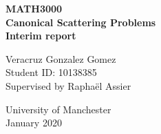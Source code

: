 \begin{titlepage}
   \begin{center}
       \vspace*{1cm}

       \textbf{MATH3000} \\
       \textbf{Canonical Scattering Problems}\\
       \textbf{Interim report}

       \vspace{1.5cm}

       Veracruz Gonzalez Gomez \\
       Student ID: 10138385 \\
       Supervised by Raphaël Assier \\

       \vfill

        University of Manchester\\
        January 2020 \\

   \end{center}
\end{titlepage}

